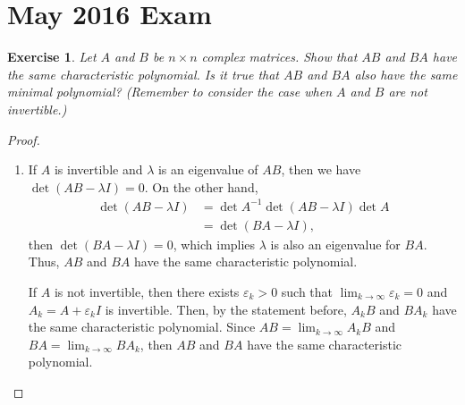 \documentclass[11pt]{article}
\newtheorem{exercise}{Exercise}[section]
\theoremstyle{definition}
\numberwithin{equation}{subsection}
\begin{document}
\newpage
\section{May 2016 Exam}

\begin{exercise}\label{May_2016_1}
Let $A$ and $B$ be $n \times n$ complex matrices. Show that $AB$ and $BA$ have the same characteristic polynomial. Is it true that $AB$ and $BA$ also have the same minimal polynomial? (Remember to consider the case when $A$ and $B$ are not invertible.)
\end{exercise}
\begin{proof}
~\begin{enumerate}[label=(\alph*)]
    \item If $A$ is invertible and $\lambda$ is an eigenvalue of $AB$, then we have $\det (AB - \lambda I) = 0$. On the other hand,
    \begin{align*}
        \det (AB - \lambda I) & = \det A^{-1} \det (AB - \lambda I) \det A \\
        & = \det (BA - \lambda I),
    \end{align*}
    then $\det (BA - \lambda I) = 0$, which implies $\lambda$ is also an eigenvalue for $BA$. Thus, $AB$ and $BA$ have the same characteristic polynomial.
    
    If $A$ is not invertible, then there exists $\varepsilon_k > 0$ such that $\lim_{k\to\infty} \varepsilon_k = 0$ and $A_k = A + \varepsilon_k I$ is invertible. Then, by the statement before, $A_kB$ and $BA_k$ have the same characteristic polynomial. Since $AB = \lim_{k\to\infty}A_kB$ and $BA = \lim_{k\to\infty}BA_k$, then $AB$ and $BA$ have the same characteristic polynomial.
    

\end{enumerate}
\end{proof}
\end{document}
